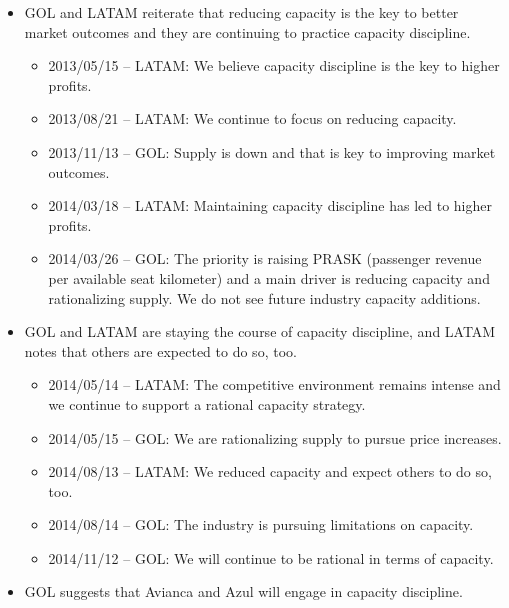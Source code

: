 \begin{itemize}
\item GOL and LATAM reiterate that reducing capacity is the key to better
market outcomes and they are continuing to practice capacity discipline.

\begin{itemize}
\item 2013/05/15 -- LATAM: We believe capacity discipline is the key to
higher profits.

\item 2013/08/21 -- LATAM: We continue to focus on reducing capacity.


\item 2013/11/13 -- GOL: Supply is down and that is key to improving market
outcomes.

\item 2014/03/18 -- LATAM: Maintaining capacity discipline has led to higher
profits.

\item 2014/03/26 -- GOL: The priority is raising PRASK (passenger revenue
per available seat kilometer) and a main driver is reducing capacity and
rationalizing supply. We do not see future industry capacity additions.

\end{itemize}

\item GOL and LATAM are staying the course of capacity discipline,
and LATAM notes that others are expected to do so, too.

\begin{itemize}
\item 2014/05/14 -- LATAM: The competitive environment remains intense and
we continue to support a rational capacity strategy.

\item 2014/05/15 -- GOL: We are rationalizing supply to pursue price
increases.

\item 2014/08/13 -- LATAM: We reduced capacity and expect others to do so,
too.

\item 2014/08/14 -- GOL: The industry is pursuing limitations on capacity.


\item 2014/11/12 -- GOL: We will continue to be rational in terms of
capacity.
\end{itemize}

\item GOL suggests that Avianca and Azul will engage in capacity discipline.


\end{itemize}
